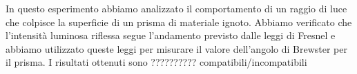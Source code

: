 In questo esperimento abbiamo analizzato il comportamento di un raggio di luce
che colpisce la superficie di un prisma di materiale ignoto.
Abbiamo verificato che l’intensità luminosa riflessa segue l’andamento
previsto dalle leggi di Fresnel e abbiamo utilizzato queste leggi per misurare
il valore dell'angolo di Brewster per il prisma.
I risultati ottenuti sono ?????????? compatibili/incompatibili %
\endinput
